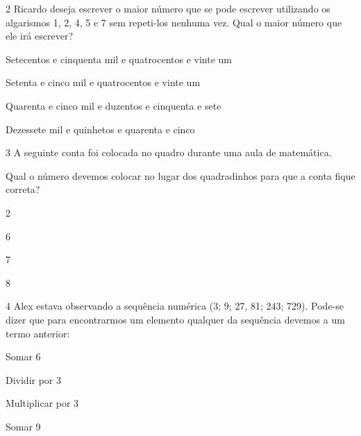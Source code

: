 \num{2} Ricardo deseja escrever o maior número que se pode escrever
utilizando os algarismos 1, 2, 4, 5 e 7 sem repeti-los nenhuma vez. Qual
o maior número que ele irá escrever?

\begin{escolha}
\item
  Setecentos e cinquenta mil e quatrocentos e vinte um
\item
  Setenta e cinco mil e quatrocentos e vinte um
\item
  Quarenta e cinco mil e duzentos e cinquenta e sete
\item
  Dezessete mil e quinhetos e quarenta e cinco
\end{escolha}


\num{3} A seguinte conta foi colocada no quadro durante uma aula de
matemática.


Qual o número devemos colocar no lugar dos quadradinhos para que a conta
fique correta?

\begin{escolha}
\item
  2
\item
  6
\item
  7
\item
  8
\end{escolha}


\num{4} Alex estava observando a sequência numérica (3; 9; 27, 81; 243;
729). Pode-se dizer que para encontrarmos um elemento qualquer da
sequência devemos a um termo anterior:

\begin{escolha}
\item
  Somar 6
\item
  Dividir por 3
\item
  Multiplicar por 3
\item
  Somar 9
\end{escolha}

